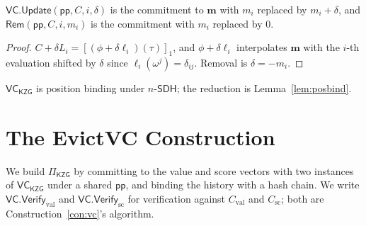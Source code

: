 \documentclass[version=submission]{iacrcc}
\theoremstyle{definition}
\newcommand{\Vfy}{\mathsf{Verify}}
\newcommand{\Update}{\mathsf{Update}}
\newcommand{\Rem}{\mathsf{Rem}}
\newcommand{\pp}{\mathsf{pp}}
\newcommand{\Val}{\mathrm{val}}
\newcommand{\Sc}{\mathrm{sc}}
\newcommand{\Cval}{C_{\Val}}
\newcommand{\Csc}{C_{\Sc}}
\newcommand{\VC}{\mathsf{VC}}
\newcommand{\gone}[1]{\left[#1\right]_{1}}
\newcommand{\lag}{\ell}
\newcommand{\nsdh}{n\text{-}\mathsf{SDH}}
\begin{document}
\begin{lemma}\label{lem:update}
$\VC.\Update(\pp,C,i,\delta)$ is the commitment to $\mathbf{m}$ with $m_i$
replaced by $m_i+\delta$, and $\Rem(\pp,C,i,m_i)$ is the commitment with $m_i$
replaced by $0$.
\end{lemma}
\begin{proof}
$C+\delta L_i=\gone{(\phi+\delta\lag_i)(\tau)}$, and $\phi+\delta\lag_i$
interpolates $\mathbf{m}$ with the $i$-th evaluation shifted by $\delta$ since
$\lag_i(\omega^{j})=\delta_{ij}$. Removal is $\delta=-m_i$.
\end{proof}

\begin{remark}\label{rem:vcbind}
$\VC_{\mathsf{KZG}}$ is position binding under $\nsdh$; the reduction is
Lemma~\ref{lem:posbind}.
\end{remark}

\section{The EvictVC Construction}\label{sec:construction}

We build $\Pi_{\mathsf{KZG}}$ by committing to the value and score vectors with
two instances of $\VC_{\mathsf{KZG}}$ under a shared $\pp$, and binding the
history with a hash chain. We write $\VC.\Vfy_{\Val}$ and $\VC.\Vfy_{\Sc}$ for
verification against $\Cval$ and $\Csc$; both are
Construction~\ref{con:vc}'s algorithm.
\end{document}
